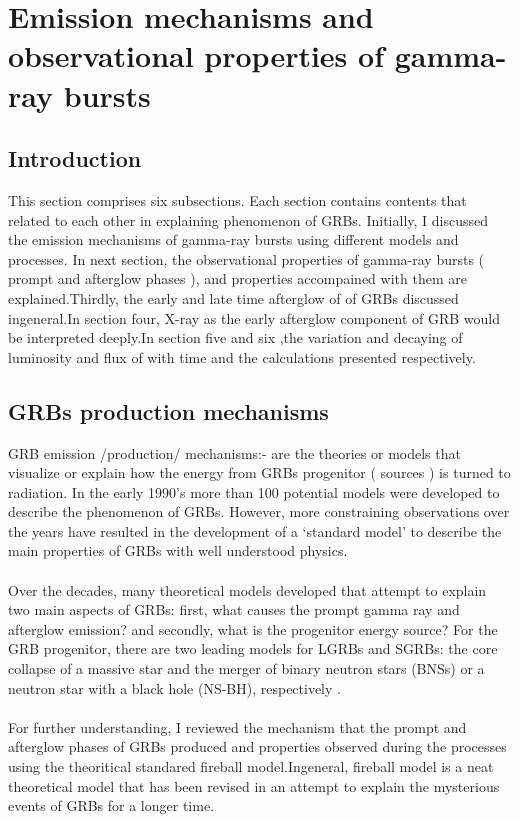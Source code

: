 \setcounter{chapter}{1}
\chapter{ Emission mechanisms and observational properties of gamma-ray bursts}
\label{chap:2}
\section{Introduction}
This section comprises six subsections. Each section contains contents that related to each other in explaining  phenomenon of GRBs. Initially, I discussed the emission mechanisms of gamma-ray bursts using different models and processes. In next section, the observational properties  of gamma-ray bursts ( prompt and  afterglow phases ), and  properties accompained with them are explained.Thirdly, the early  and late time afterglow of of GRBs discussed ingeneral.In section four, X-ray as the early afterglow component of GRB would be interpreted deeply.In section five and six ,the variation and decaying of luminosity and flux of with time and the calculations presented respectively.    
\section{GRBs production mechanisms}
GRB emission  /production/ mechanisms:- are the theories or models that visualize or  explain  how the  energy from GRBs  progenitor ( sources ) is turned to radiation. In the early 1990’s   more than 100  potential  models  were  developed to describe the phenomenon of GRBs. However, more  constraining  observations  over  the  years have resulted in the  development of a ‘standard model’ to describe the main properties of GRBs with well understood  physics.\\\\
Over the decades, many theoretical models developed that attempt to explain two main aspects of GRBs: first, what causes the prompt gamma ray and afterglow emission? and secondly, what is the progenitor energy source? For the GRB progenitor, there are two leading models for LGRBs and SGRBs: the core collapse of a massive star and the merger of binary neutron stars (BNSs) or a neutron star with a black hole (NS-BH), respectively \citep {13}.\\\\ For further  understanding, I reviewed the mechanism   that the prompt and  afterglow  phases of GRBs produced  and  properties  observed during the processes  using  the  theoritical standared  fireball model.Ingeneral, fireball model is a neat theoretical model that has been revised in an attempt to explain  the mysterious events of GRBs for a longer  time.    
